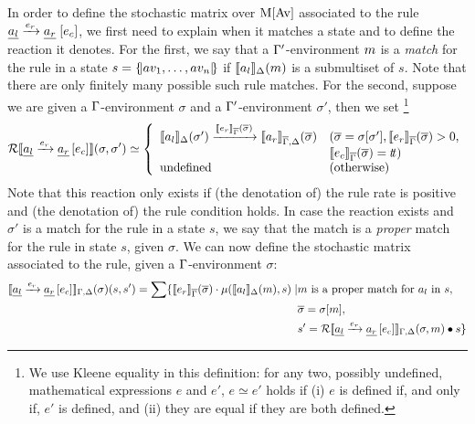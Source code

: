 In order to define the stochastic matrix over $\mathrm{M}[\mathrm{Av}]$ associated to
the rule $ \underline{a_l} \xrightarrow{e_r} \underline{a_r} \; [e_c]$, we first need to explain
when it matches a state and to define the reaction it denotes.
%
For the first, we say that a $\Gamma'$-environment $m$ is a \emph{match} for the
rule in a state $s= \{\!| av_1, \dots, av_n |\!\}$ if $\llbracket a_l \rrbracket_{\Delta}( m)$ is a
submultiset of $s$. Note that there are only finitely many possible such rule
matches.
%
For the second, suppose we are given a $\Gamma$-environment $\sigma$ and a
$\Gamma'$-environment $\sigma'$, then we set\hspace{-2pt}
%
\footnote{We use Kleene equality in this definition: for any two, possibly undefined, mathematical expressions $e$ and $e'$, $e \simeq e'$ holds if (i) $e$ is defined if, and only if, $e'$ is defined, and (ii) they are equal if they are both defined.}
%
\begin{equation*}
\mathcal{R}\llbracket \underline{a_l} \xrightarrow{e_r} \underline{a_r} \, [e_c] \rrbracket(\sigma, \sigma') \simeq \left\{ 
\begin{array}{ll}
\llbracket a_l \rrbracket_{\Delta}(\sigma') \xrightarrow{\llbracket e_r \rrbracket_{\overline{\Gamma}}(\overline{\sigma})} \llbracket a_r \rrbracket_{\overline{\Gamma}, \Delta}(\overline{\sigma})  &  
                                                                                                                  (\overline{\sigma} = \sigma[\sigma'],  \llbracket e_r \rrbracket_{\overline{\Gamma}}(\overline{\sigma}) > 0, \\
  & \llbracket e_c \rrbracket_{\overline{\Gamma}}(\overline{\sigma}) = t\!t)\\
\text{undefined } & (\text{otherwise})
\end{array}
\right .
\end{equation*}
%
Note that this reaction only exists if (the denotation of) the rule rate is
positive and (the denotation of) the rule condition holds. In case the reaction
exists and $\sigma'$ is a match for the rule in a state $s$, we say that the match is
a \emph{proper} match for the rule in state $s$, given $\sigma$.
%
We can now define the stochastic matrix associated to the rule, given a $\Gamma$-environment $\sigma$:
%
\begin{equation*}
\begin{split}
    \llbracket 
{\underline{a_l} \xrightarrow{e_r} \underline{a_r} \, [e_c]} \rrbracket_{\Gamma,\Delta}(\sigma) (s,s')  =   \sum\{\llbracket e_r \rrbracket_{\overline{ \Gamma}}(\overline{\sigma})\cdot \mu(\llbracket a_l \rrbracket_{ \Delta}(m),s)\mid 
& m \mbox{ is a proper match for } a_l \mbox{ in } s,\, \\
& \overline{\sigma} = \sigma[m], \\
& s' = \mathcal{R}\llbracket {\underline{a_l} \xrightarrow{e_r} \underline{a_r} \, [e_c]} \rrbracket_{\Gamma,\Delta}(\sigma,m)\bullet s \}
\end{split}
\end{equation*}
